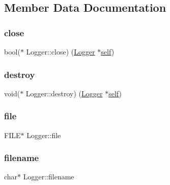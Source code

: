 \subsection{Member Data Documentation}
\mbox{\label{structLogger_a74d2694f55a84cc00935fd090e9af86d}} 
\subsubsection{\texorpdfstring{close}{close}}
{\footnotesize\ttfamily bool($\ast$ Logger\+::close) (\hyperlink{structLogger}{Logger} $\ast$\hyperlink{structLogger_a220cd94b89be365dba07df9cbdf2d15f}{self})}

\mbox{\label{structLogger_a710869ca085596ec9e08fc37303af982}} 
\subsubsection{\texorpdfstring{destroy}{destroy}}
{\footnotesize\ttfamily void($\ast$ Logger\+::destroy) (\hyperlink{structLogger}{Logger} $\ast$\hyperlink{structLogger_a220cd94b89be365dba07df9cbdf2d15f}{self})}

\mbox{\label{structLogger_ad00c914c1f38de6d069cb788b9074d8f}} 
\subsubsection{\texorpdfstring{file}{file}}
{\footnotesize\ttfamily F\+I\+LE$\ast$ Logger\+::file}

\mbox{\label{structLogger_a4a7913dbecc583e935e8c18ec62716ab}} 
\subsubsection{\texorpdfstring{filename}{filename}}
{\footnotesize\ttfamily char$\ast$ Logger\+::filename}

\mbox{\label{structLogger_ab614de252dd023fdf6b92a048897c25c}} 
